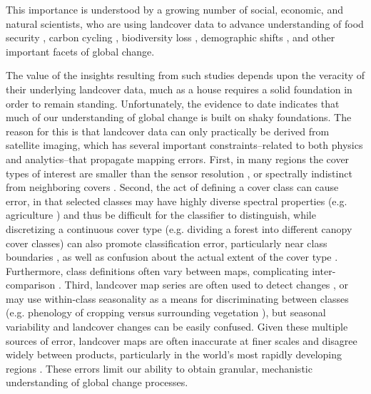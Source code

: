 \documentclass{pnastwo}
\begin{document}
\begin{article}
This importance is understood by a growing number of social, economic, and natural scientists, who are using landcover data to advance understanding of food security \cite{lark_cropland_2015,wright_recent_2013, licker_mind_2010}, carbon cycling \cite{asner_high-resolution_2010, gaveau_major_2014}, biodiversity loss \cite{newbold_global_2015, luoto_predicting_2004}, demographic shifts \cite{linard_assessing_2010}, and other important facets of global change. 

The value of the insights resulting from such studies depends upon the veracity of their underlying landcover data, much as a house requires a solid foundation in order to remain standing. Unfortunately, the evidence to date indicates that much of our understanding of global change is built on shaky foundations. The reason for this is that landcover data can only practically be derived from satellite imaging, which has several important constraints--related to both physics and analytics--that propagate mapping errors. First, in many regions the cover types of interest are smaller than the sensor resolution \cite[e.g. smallholder's farms][]{jain_mapping_2013,debats_generalized_2015,ozdogan_resolution_2006}, or spectrally indistinct from neighboring covers \cite{sweeney_mapping_2015}. Second, the act of defining a cover class can cause error, in that selected classes may have highly diverse spectral properties (e.g. agriculture \cite{debats_generalized_2015,estes_platform_2015}) and thus be difficult for the classifier to distinguish, while discretizing a continuous cover type (e.g. dividing a forest into different canopy cover classes) can also promote classification error, particularly near class boundaries \cite{foody_status_2002}, as well as confusion about the actual extent of the cover type \cite{sexton_conservation_2015}. Furthermore, class definitions often vary between maps, complicating inter-comparison \cite{kuemmerle_challenges_2013}. Third, landcover map series are often used to detect changes \cite[e.g.][]{gross_monitoring_2013}, or may use within-class seasonality as a means for discriminating between classes (e.g. phenology of cropping versus surrounding vegetation \cite{sweeney_mapping_2015}), but seasonal variability and landcover changes can be easily confused. Given these multiple sources of error, landcover maps are often inaccurate at finer scales and disagree widely between products, particularly in the world's most rapidly developing regions \cite{estes_projected_2013, fritz_comparison_2010, fritz_cropland_2011}. These errors limit our ability to obtain granular, mechanistic understanding of global change processes. 


\end{article}
\end{document}
